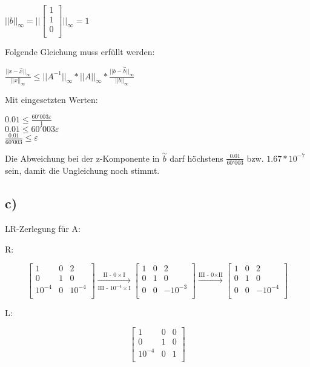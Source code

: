 \documentclass{article}
\begin{document}
\(||b||_\infty = ||
\begin{bmatrix} 
1 \\
1 \\
0 \\
\end{bmatrix}
||_\infty = 1\)

Folgende Gleichung muss erfüllt werden:

\(\frac{||x - \overset{\sim}{x}||_\infty}{||x||_\infty} \leq ||A^{-1}||_\infty * ||A||_\infty * \frac{||b - \overset{\sim}{b}||_\infty}{||b||_\infty}\)

Mit eingesetzten Werten:

\(0.01 \leq \frac{60'003\varepsilon}{1}\)\\
\(0.01 \leq 60'003\varepsilon\)\\
\(\frac{0.01}{60'003} \leq \varepsilon\)

Die Abweichung bei der z-Komponente in \(\overset{\sim}{b}\) darf höchstens \(\frac{0.01}{60'003}\) bzw. \(1.67*10^{-7}\) sein, damit die Ungleichung noch stimmt.

\newpage
\subsection*{c)}

LR-Zerlegung für A:

R:

\[
\begin{bmatrix} 
1 & 0 & 2 \\
0 & 1 & 0 \\
10^{-4} & 0 & 10^{-4} \\
\end{bmatrix}
\xrightarrow[\text{III - }10^{-4}\times\text{I}]{\text{II - }0\times\text{I}}
\begin{bmatrix} 
1 & 0 & 2 \\
0 & 1 & 0 \\
0 & 0 & -10^{-3} \\
\end{bmatrix}
\xrightarrow{\text{III - 0}\times\text{II}}
\begin{bmatrix} 
1 & 0 & 2 \\
0 & 1 & 0 \\
0 & 0 & -10^{-4} \\
\end{bmatrix}
\]

L:

\[
\begin{bmatrix} 
1 & 0 & 0 \\
0 & 1 & 0 \\
10^{-4} & 0 & 1 \\
\end{bmatrix}
\]
\end{document}
